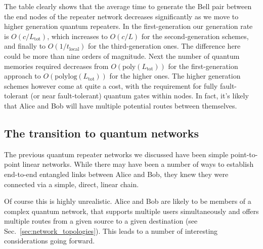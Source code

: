 The table clearly shows that the average time to generate the Bell pair between the end nodes of the repeater network decreases significantly as we move to higher generation quantum repeaters. In the first-generation our generation rate is $O(c/L_\mathrm{tot})$, which increases to $O(c/L)$ for the second-generation schemes, and finally to $O(1/t_\mathrm{local})$ for the third-generation ones. The difference here could be more than nine orders of magnitude. Next the number of quantum memories required decreases from $O(\mathrm{poly}(L_\mathrm{tot}))$ for the first-generation approach to $O(\mathrm{polylog}(L_\mathrm{tot}))$ for the higher ones. The higher generation schemes however come at quite a cost, with the requirement for fully fault-tolerant (or near fault-tolerant) quantum gates within nodes. In fact, it's likely that Alice and Bob will have multiple potential routes between themselves.

%
%

\subsection{The transition to quantum networks}

The previous quantum repeater networks we discussed have been simple point-to-point linear networks. While there may have been a number of ways to establish end-to-end entangled links between Alice and Bob, they knew they were connected via a simple, direct, linear chain.

Of course this is highly unrealistic. Alice and Bob are likely to be members of a complex quantum network, that supports multiple users simultaneously and offers multiple routes from a given source to a given destination (see Sec.~\ref{sec:network_topologies}). This leads to a number of interesting considerations going forward. 

